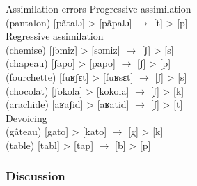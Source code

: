 \documentclass[output=paper,newtxmath,modfonts,nonflat,draftmode]{langsci/langscibook}
\begin{document}
\ea Assimilation errors \label{ex:takam:assimilation_errors}
\ea Progressive assimilation\\
    (pantalon)  [pãtalɔ] > [pãpalɔ] $\rightarrow$ [t] > [p]\\
\ex Regressive assimilation\\
    (chemise) [ʃəmiz] > [səmiz] $\rightarrow$ [ʃ] > [s]\\
    (chapeau) [ʃapo] > [papo] $\rightarrow$ [ʃ] > [p]\\
    (fourchette) [fuʁʃɛt] > [fuʁsɛt] $\rightarrow$ [ʃ] > [s]\\
    (chocolat) [ʃokola] > [kokola] $\rightarrow$ [ʃ] > [k]\\ 
    (arachide) [aʁaʃid] > [aʁatid] $\rightarrow$  [ʃ] > [t]\\
\ex Devoicing\\
    (gâteau) [gato] > [kato] $\rightarrow$ [g] > [k]\\
    (table) [tabl] > [tap] $\rightarrow$ [b] > [p]\\
\z
\z




\subsubsection{Discussion} %
\end{document}
